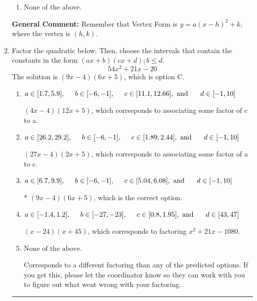 \documentclass{extbook}[14pt]
\newcommand{\litem}[1]{\item #1

\rule{\textwidth}{0.4pt}}
\begin{document}
\begin{enumerate}
{\begin{enumerate}[label=\Alph*.]
\begin{multicols}{2}
\end{multicols}\item None of the above.\end{enumerate}
\textbf{General Comment:} Remember that Vertex Form is $y = a(x-h)^2+k$, where the vertex is $(h, k)$.
}
\litem{
Factor the quadratic below. Then, choose the intervals that contain the constants in the form $(ax+b)(cx+d); b \leq d.$
\[ 54x^{2} +21 x -20 \]
The solution is \( (9x -4)(6x + 5) \), which is option C.\begin{enumerate}[label=\Alph*.]
\item \( a \in [1.7, 5.9], \hspace*{5mm} b \in [-6, -1], \hspace*{5mm} c \in [11.1, 12.66], \text{ and } \hspace*{5mm} d \in [-1, 10] \)

 $(4x -4)(12x + 5)$, which corresponds to associating some factor of c to a.
\item \( a \in [26.2, 29.2], \hspace*{5mm} b \in [-6, -1], \hspace*{5mm} c \in [1.89, 2.44], \text{ and } \hspace*{5mm} d \in [-1, 10] \)

 $(27x -4)(2x + 5)$, which corresponds to associating some factor of a to c.
\item \( a \in [6.7, 9.9], \hspace*{5mm} b \in [-6, -1], \hspace*{5mm} c \in [5.04, 6.08], \text{ and } \hspace*{5mm} d \in [-1, 10] \)

* $(9x -4)(6x + 5)$, which is the correct option.
\item \( a \in [-1.4, 1.2], \hspace*{5mm} b \in [-27, -23], \hspace*{5mm} c \in [0.8, 1.95], \text{ and } \hspace*{5mm} d \in [43, 47] \)

 $(x -24)(x + 45)$, which corresponds to factoring $x^{2} +21 x -1080$.
\item \( \text{None of the above.} \)

 Corresponds to a different factoring than any of the predicted options. If you get this, please let the coordinator know so they can work with you to figure out what went wrong with your factoring.
\end{enumerate}

}
\end{enumerate}
\end{document}
